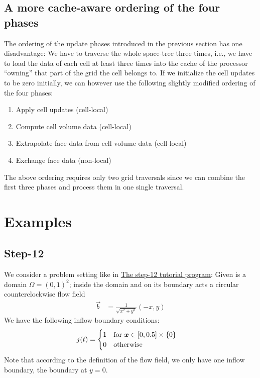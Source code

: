 \documentclass{scrreprt}
\begin{document}
\section{A more cache-aware ordering of the four phases}
The ordering of the update phases introduced in the previous
section has one disadvantage:
We have to traverse the whole space-tree three times, i.e.,
we have to load the data of each cell at least three times
into the cache of the processor ``owning'' that part
of the grid the cell belongs to.
If we initialize the cell updates to be zero initially,
we can however use the following slightly modified ordering of the four phases:
\begin{enumerate}
  \item Apply cell updates (cell-local)
  \item Compute cell volume data (cell-local)
  \item Extrapolate face data from cell volume data (cell-local)
  \item Exchange face data (non-local)
\end{enumerate}
The above ordering requires only two grid traversals since
we can combine the first three phases and process them in one single traversal.

\chapter{Examples}
\section{Step-12}
We consider a problem setting like in
\href{http://www.dealii.org/developer/doxygen/deal.II/step_12.html}{The
step-12 tutorial program}:
Given is a domain $\Omega=(0,1)^2$; inside the domain and on its boundary acts
a circular counterclockwise flow field
\begin{align}
\vec{b} &= \frac{1}{\sqrt{x^2+y^2}}(-x,y)
\end{align}
We have the following inflow boundary conditions: 
\begin{align}
j(t) &= 
\begin{cases}
1 & \textup{for } {\boldsymbol x}\in [0,0.5]\times\{0\} \\
0 & \textup{otherwise}
\end{cases}
\end{align}
Note that according to the definition of the flow field, we only have one inflow
boundary, the boundary at $y=0$.

{}
\end{document}
